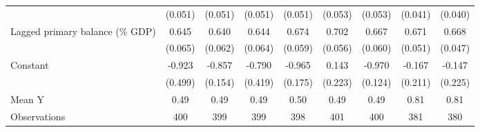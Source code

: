{\begin{tabular}{l*{8}{c}}
                    &     (0.051)         &     (0.051)         &     (0.051)         &     (0.051)         &     (0.053)         &     (0.053)         &     (0.041)         &     (0.040)         \\
\addlinespace
Lagged primary balance (\% GDP)&       0.645\sym{***}&       0.640\sym{***}&       0.644\sym{***}&       0.674\sym{***}&       0.702\sym{***}&       0.667\sym{***}&       0.671\sym{***}&       0.668\sym{***}\\
                    &     (0.065)         &     (0.062)         &     (0.064)         &     (0.059)         &     (0.056)         &     (0.060)         &     (0.051)         &     (0.047)         \\
\addlinespace
Constant            &      -0.923\sym{*}  &      -0.857\sym{***}&      -0.790\sym{*}  &      -0.965\sym{***}&       0.143         &      -0.970\sym{***}&      -0.167         &      -0.147         \\
                    &     (0.499)         &     (0.154)         &     (0.419)         &     (0.175)         &     (0.223)         &     (0.124)         &     (0.211)         &     (0.225)         \\
\midrule
Mean Y              &        0.49         &        0.49         &        0.49         &        0.50         &        0.49         &        0.49         &        0.81         &        0.81         \\
Observations        &         400         &         399         &         399         &         398         &         401         &         400         &         381         &         380         \\
\bottomrule
\end{tabular}
}
